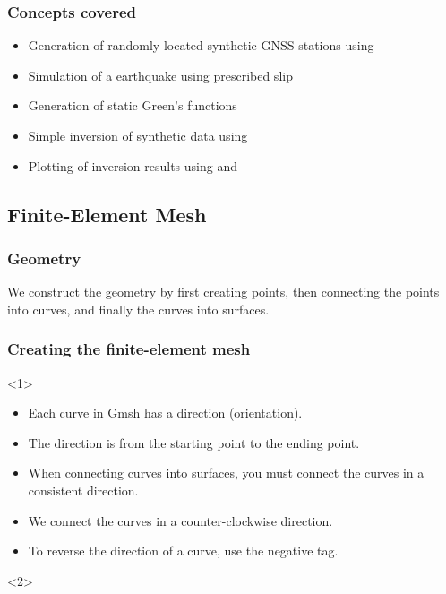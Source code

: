 \documentclass[aspectratio=169]{beamer}
\begin{document}
\begin{frame}
  \frametitle{Concepts covered}
  \summary{}

  \begin{itemize}
  \item Generation of randomly located synthetic GNSS stations using 
  \item Simulation of a earthquake using prescribed slip
  \item Generation of static Green's functions
  \item Simple inversion of synthetic data using 
  \item Plotting of inversion results using  and 
  \end{itemize}
  
\end{frame}

\subsection{Finite-Element Mesh}

\begin{frame}
  \frametitle{Geometry}
  \summary{}

  We construct the geometry by first creating points, then connecting the points into curves, and finally the curves into surfaces.
  
  
\end{frame}


\begin{frame}
  \frametitle{Creating the finite-element mesh}
  \summary{}

  \begin{onlyenv}<1>
    \begin{itemize}
    \item Each curve in Gmsh has a direction (orientation).
    \item The direction is from the starting point to the ending point.
    \item When connecting curves into surfaces, you must connect the curves in a consistent direction.
    \item We connect the curves in a counter-clockwise direction.
    \item To reverse the direction of a curve, use the negative tag.
    \end{itemize}
  \end{onlyenv}
  \begin{onlyenv}<2>
  \end{onlyenv}
  
\end{frame}
\end{document}

